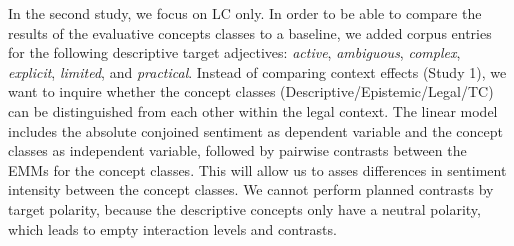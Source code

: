 \documentclass{article}
\begin{document}
In the second study, we focus on LC only. In order to be able to compare the results of the evaluative concepts classes to a baseline, we added corpus entries for the following descriptive target adjectives: \textit{active}, \textit{ambiguous}, \textit{complex}, \textit{explicit}, \textit{limited}, and \textit{practical}. Instead of comparing context effects (Study 1), we want to inquire whether the concept classes (Descriptive/Epistemic/Legal/TC) can be distinguished from each other within the legal context. The linear model includes the absolute conjoined sentiment as dependent variable and the concept classes as independent variable, followed by pairwise contrasts between the EMMs for the concept classes. This will allow us to asses differences in sentiment intensity between the concept classes. 
We cannot perform planned contrasts by target polarity, because the descriptive concepts only have a neutral polarity, which leads to empty interaction levels and contrasts. %


\end{document}
